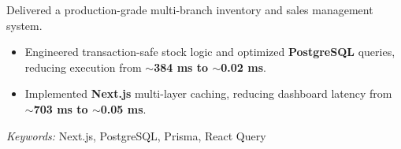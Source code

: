 \noindent
{}

\noindent
Delivered a production-grade multi-branch inventory and sales management system.

\begin{itemize}
    \item Engineered transaction-safe stock logic and optimized \textbf{PostgreSQL} queries, reducing execution from \textbf{$\sim$384 ms to $\sim$0.02 ms}.
    \item Implemented \textbf{Next.js} multi-layer caching, reducing dashboard latency from \textbf{$\sim$703 ms to $\sim$0.05 ms}.
\end{itemize}

\noindent
\textit{Keywords:} Next.js, PostgreSQL, Prisma, React Query
